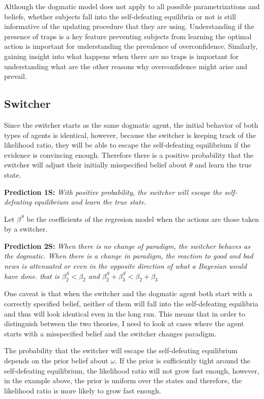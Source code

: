 \documentclass[
  12pt,
]{article}
\begin{document}
Although the dogmatic model does not apply to all possible
parametrizations and beliefs, whether subjects fall into the
self-defeating equilibria or not is still informative of the updating
procedure that they are using. Understanding if the presence of traps is
a key feature preventing subjects from learning the optimal action is
important for understanding the prevalence of overconfidence. Similarly,
gaining insight into what happens when there are no traps is important
for understanding what are the other reasons why overconfidence might
arise and prevail.

\hypertarget{switcher}{%
\subsection{Switcher}\label{switcher}}

Since the switcher starts as the same dogmatic agent, the initial
behavior of both types of agents is identical, however, because the
switcher is keeping track of the likelihood ratio, they will be able to
escape the self-defeating equilibrium if the evidence is convincing
enough. Therefore there is a positive probability that the switcher will
adjust their initially misspecified belief about \(\theta\) and learn
the true state.

\textbf{Prediction 1S:} \emph{With positive probability, the switcher
will escape the self-defeating equilibrium and learn the true state.}

Let \(\beta^S\) be the coefficients of the regresion model when the
actions are those taken by a switcher.

\textbf{Prediction 2S:} \emph{When there is no change of paradigm, the
switcher behaves as the dogmatic. When there is a change in paradigm,
the reaction to good and bad news is attenuated or even in the opposite
direction of what a Bayesian would have done. that is
\(\beta_2^S<\beta_2\) and \(\beta_2^S + \beta_3^S<\beta_2+\beta_3\)}

One caveat is that when the switcher and the dogmatic agent both start
with a correctly specified belief, neither of them will fall into the
self-defeating equilibria and thus will look identical even in the long
run. This means that in order to distinguish between the two theories, I
need to look at cases where the agent starts with a misspecified belief
and the switcher changes paradigm.

The probability that the switcher will escape the self-defeating
equilibrium depends on the prior belief about \(\omega\). If the prior
is sufficiently tight around the self-defeating equilibrium, the
likelihood ratio will not grow fast enough, however, in the example
above, the prior is uniform over the states and therefore, the
likelihood ratio is more likely to grow fast enough.
\end{document}
